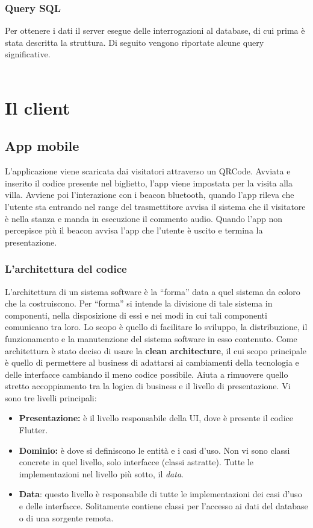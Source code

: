 \documentclass[12pt]{article}
\begin{document}
\subsubsection{Query SQL}
Per ottenere i dati il server esegue delle interrogazioni al database, di cui prima è stata descritta la struttura. Di seguito vengono riportate alcune query significative.\\\\

\section{Il client}
\subsection{App mobile}
L'applicazione viene scaricata dai visitatori attraverso un QRCode. Avviata
e inserito il codice presente nel biglietto, l’app viene impostata per la visita alla villa. Avviene poi l'interazione con i beacon bluetooth, quando l’app rileva che l'utente sta entrando nel range del trasmettitore avvisa il sistema che il visitatore è nella stanza e manda in esecuzione il commento audio. Quando l’app non percepisce più il beacon avvisa l’app che l’utente è uscito e termina la presentazione.

\subsubsection{L'architettura del codice}
L’architettura di un sistema software è la “forma” data a quel sistema da coloro che la costruiscono. Per  “forma” si intende la divisione di tale sistema in componenti, nella disposizione di essi e nei modi in cui tali componenti comunicano tra loro. Lo scopo è  quello di facilitare lo sviluppo, la distribuzione, il funzionamento e la manutenzione del sistema software in esso contenuto.\cite{architettura_codice}
Come architettura è stato deciso di usare la \textbf{clean architecture}, il cui scopo principale è quello di permettere al business di adattarsi ai cambiamenti della tecnologia e delle interfacce cambiando il meno codice possibile. Aiuta a rimuovere quello stretto accoppiamento tra la logica di business e il livello di presentazione.\cite{architettura_introduction} Vi sono tre livelli principali:
\begin{itemize}
    \item \textbf{Presentazione:} è il livello responsabile della UI, dove è presente il codice Flutter.
    \item \textbf{Dominio:} è dove si definiscono le entità e i casi d'uso. Non vi sono classi concrete in quel livello, solo interfacce (classi astratte). Tutte le implementazioni nel livello più sotto, il \emph{data}. 
    \item \textbf{Data}: questo livello è responsabile di tutte le implementazioni dei casi d'uso e delle interfacce. Solitamente contiene classi per l'accesso ai dati del database o di una sorgente remota.
\end{itemize}
\end{document}
